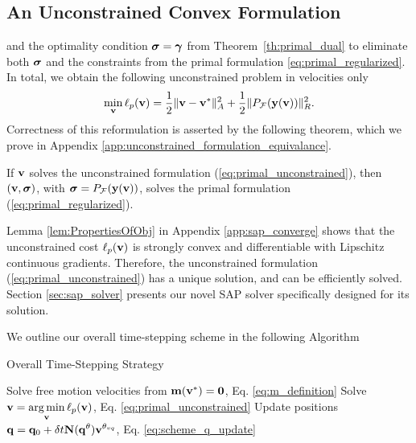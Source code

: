 

\subsection{An Unconstrained Convex Formulation}
\label{sec:unconstrained_convex_formulation}

 and the optimality condition ${\bm{\sigma}}
= {\bm\gamma}$ from Theorem~\ref{th:primal_dual} to eliminate both ${\bm{\sigma}}$ and
the constraints from the primal formulation \eqref{eq:primal_regularized}. In
total, we obtain the following unconstrained problem in velocities only
\begin{eqnarray}
	\min_{\mf{v}} \ell_p(\mf{v}) = \frac{1}{2}\Vert\mf{v}-\mf{v}^*\Vert_{A}^2 +
	\frac{1}{2}\Vert P_\mathcal{F}(\mf{y}(\mf{v}))\Vert_R^2.
	\label{eq:primal_unconstrained}
\end{eqnarray}
Correctness of this reformulation is asserted by the following theorem, which we
prove in Appendix \ref{app:unconstrained_formulation_equivalance}.
\begin{theorem}
  If  ${\mathbf{v}}$ solves the unconstrained formulation
    (\ref{eq:primal_unconstrained}), then $({\mathbf{v}}, {\bm\sigma})$, with ${\bm\sigma}
    =P_\mathcal{F}({\mathbf{y}}({\mathbf{v}}))$, solves the primal formulation
    (\ref{eq:primal_regularized}).
    \label{th:unconstrained_formulation_equivalance}
\end{theorem}
Lemma \ref{lem:PropertiesOfObj} in Appendix \ref{app:sap_converge} shows that
the unconstrained cost $\ell_p({\mathbf{v}})$ is strongly convex and differentiable
with Lipschitz continuous gradients. Therefore, the unconstrained formulation
(\ref{eq:primal_unconstrained}) has a unique solution, and can be efficiently
solved.  
Section \ref{sec:sap_solver} presents our novel SAP solver specifically designed
for its solution.

We outline our overall time-stepping scheme in the following Algorithm
\begin{algorithm}[H]
	\caption{Overall Time-Stepping Strategy}
	  \label{alg:sap_time_stepping}
	  \begin{algorithmic}[1]
		  \State Solve free motion velocities from
		  ${\mathbf{m}}({\mathbf{v}}^*)={\mathbf{0}}$, Eq. \eqref{eq:m_definition}
		  \State Solve $\displaystyle {\mathbf{v}} = \operatorname*{arg\,min}_{{\mathbf{v}}} \ell_p({\mathbf{v}})$, Eq. \eqref{eq:primal_unconstrained}
		  \State Update positions $\displaystyle {\mathbf{q}} = {\mathbf{q}}_0 + \delta
		  t{\mathbf{N}}({\mathbf{q}}^{\theta}){\mathbf{v}}^{\theta_{vq}}$, Eq. \eqref{eq:scheme_q_update}
	  \end{algorithmic}
\end{algorithm}

